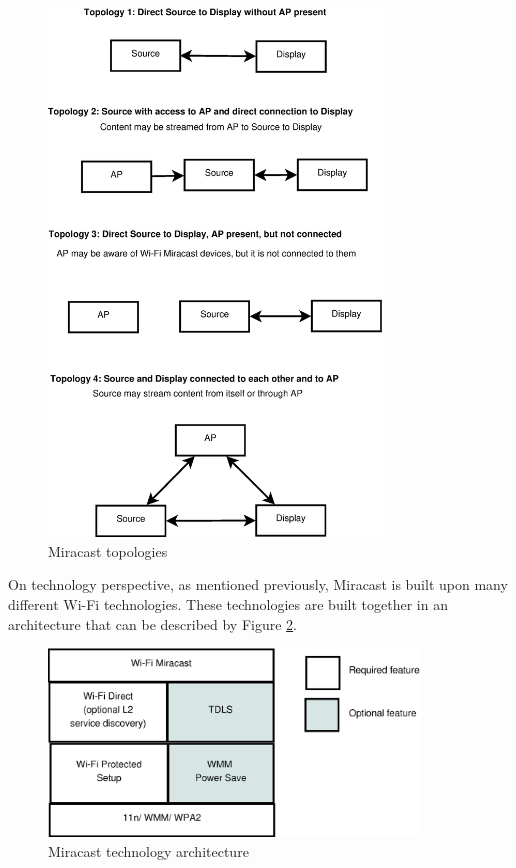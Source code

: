 \begin{figure}[htb] \centering 
\includegraphics[height=14cm]{charts/miracast_model} 
\caption{Miracast topologies \label{miracast_model}} 
\end{figure} 

On technology perspective, as mentioned previously, Miracast is built upon many different Wi-Fi technologies. These technologies are built together in an architecture that can be described by Figure \ref{miracast_architect}. 

\begin{figure}[htb] \centering 
\includegraphics[height=5cm]{charts/miracast_technology_architecture} 
\caption{Miracast technology architecture \label{miracast_architect}} 
\end{figure} 

